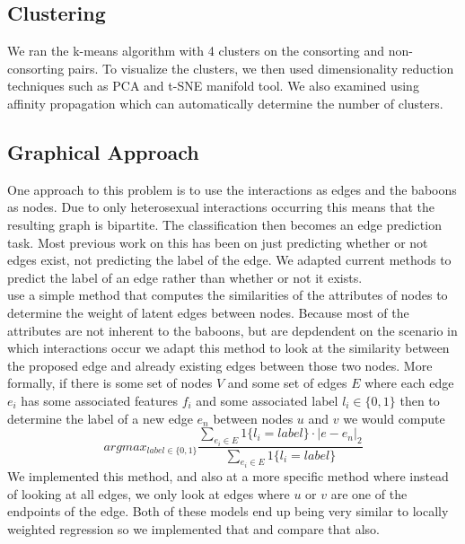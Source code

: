 \documentclass[twoside,twocolumn,paper=letter,fontsize=11pt]{article}
\begin{document}
\subsection{Clustering}

We ran the k-means algorithm with 4 clusters on the consorting and
non-consorting pairs. To visualize the clusters, we then used dimensionality
reduction techniques such as PCA and t-SNE manifold tool. We also examined
using affinity propagation which can automatically determine the number of
clusters.

\subsection{Graphical Approach}

One approach to this problem is to use the interactions as edges and the baboons as nodes. Due to only heterosexual interactions occurring this means that the resulting graph is bipartite. The classification then becomes  an edge prediction task. Most previous work on this has been on just predicting whether or not edges exist, not predicting the label of the edge. We adapted current methods to predict the label of an edge rather than whether or not it exists. \\
\cite{Macskassy:2007} use a simple method that computes the similarities of the attributes of nodes to determine the weight of latent edges between nodes. Because most of the attributes are not inherent to the baboons, but are depdendent on the scenario in which interactions occur we adapt this method to look at the similarity between the proposed edge and already existing edges between those two nodes. More formally, if there is some set of nodes $V$ and some set of edges $E$ where each edge $e_i$ has some associated features $f_i$ and some associated label $l_i\in \{0,1\}$ then to determine the label of a new edge $e_n$ between nodes $u$ and $v$ we would compute 
$$argmax_{label \in \{0,1\}} \frac{\sum_{e_i \in E}1\{l_i=label\}\cdot|e-e_n|_2}{\sum_{e_i \in E}1\{l_i=label\}}$$
We implemented this method, and also at a more specific method where instead of looking at all edges, we only look at edges where $u$ or $v$ are one of the endpoints of the edge. Both of these models end up being very similar to locally weighted regression so we implemented that and compare that also. \\
\end{document}
